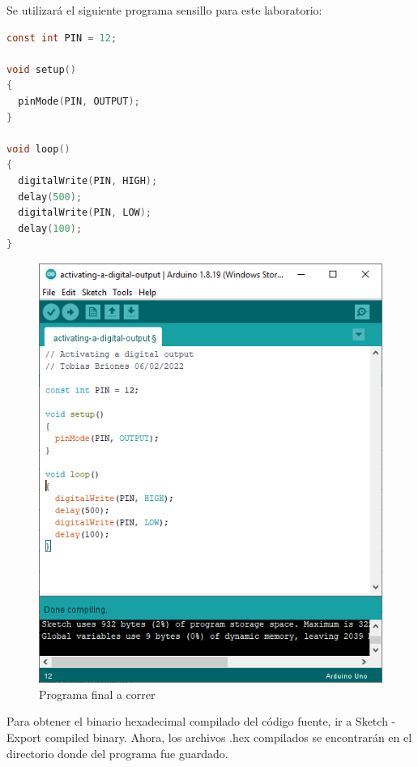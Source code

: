 \documentclass{article}
\begin{document}
    \bigbreak

    Se utilizará el siguiente programa sensillo para este laboratorio:

    \begin{lstlisting}[language=C, caption=Programa para activar una salida
    digital]
const int PIN = 12;

void setup()
{
  pinMode(PIN, OUTPUT);
}

void loop()
{
  digitalWrite(PIN, HIGH);
  delay(500);
  digitalWrite(PIN, LOW);
  delay(100);
}
    \end{lstlisting}

    \begin{figure}[H]
        \centering
        \includegraphics[width=0.3\paperwidth]{images/arduino-2.png}
        \caption{Programa final a correr}
    \end{figure}

    Para obtener el binario hexadecimal compilado del código fuente, ir a
    Sketch - Export compiled binary.
    Ahora, los archivos .hex compilados se encontrarán en el directorio donde
    del programa fue guardado.
\end{document}
